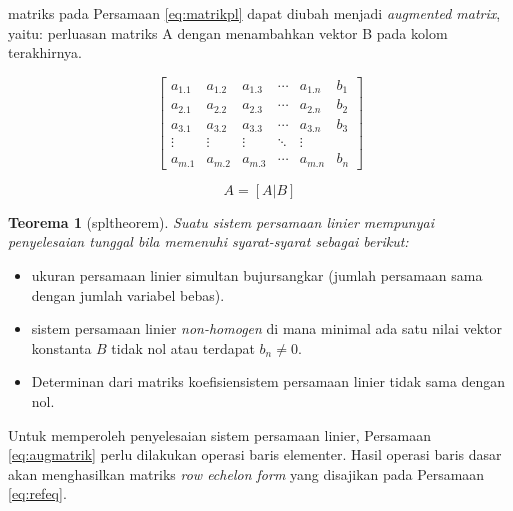 \documentclass[
]{book}
\providecommand{\tightlist}{%
  \setlength{\itemsep}{0pt}\setlength{\parskip}{0pt}}
\newtheorem{theorem}{Teorema}[chapter]
\theoremstyle{definition}
\theoremstyle{definition}
\theoremstyle{definition}
\theoremstyle{definition}
\theoremstyle{remark}
\begin{document}
matriks pada Persamaan \eqref{eq:matrikpl} dapat diubah menjadi \emph{augmented matrix}, yaitu: perluasan matriks A dengan menambahkan vektor B pada kolom terakhirnya.

\begin{equation}
\begin{bmatrix}
     a_{1.1} & a_{1.2} & a_{1.3} &\cdots& a_{1.n} & b_1     \\[0.3em]
     a_{2.1} & a_{2.2} & a_{2.3} &\cdots& a_{2.n} & b_2     \\[0.3em]
     a_{3.1} & a_{3.2} & a_{3.3} &\cdots& a_{3.n} & b_3     \\[0.3em]
     \vdots  & \vdots  & \vdots &\ddots& \vdots            \\[0.3em]
     a_{m.1} & a_{m.2} & a_{m.3} &\cdots& a_{m.n} & b_n
     \end{bmatrix}
  \label{eq:augmatrik}
\end{equation}

\begin{equation}
A=\left[A|B\right]
  \label{eq:augmatrik2}
\end{equation}

\begin{theorem}[spltheorem]
\protect\hypertarget{thm:unnamed-chunk-14}{}\label{thm:unnamed-chunk-14}Suatu sistem persamaan linier mempunyai penyelesaian tunggal bila memenuhi syarat-syarat sebagai berikut:
\end{theorem}

\begin{itemize}
\tightlist
\item
  ukuran persamaan linier simultan bujursangkar (jumlah persamaan sama dengan jumlah variabel bebas).
\item
  sistem persamaan linier \emph{non-homogen} di mana minimal ada satu nilai vektor konstanta \(B\) tidak nol atau terdapat \(b_{n}\neq 0\).
\item
  Determinan dari matriks koefisiensistem persamaan linier tidak sama dengan nol.
\end{itemize}

Untuk memperoleh penyelesaian sistem persamaan linier, Persamaan \eqref{eq:augmatrik} perlu dilakukan operasi baris elementer. Hasil operasi baris dasar akan menghasilkan matriks \emph{row echelon form} yang disajikan pada Persamaan \eqref{eq:refeq}.
\end{document}
